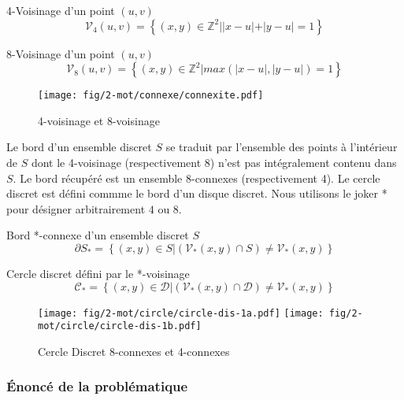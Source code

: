 \begin{Definition}{4-Voisinage d'un point $(u,v)$}
\label{def:vois-4}
  $$\mathcal{V}_4(u,v) =  \left\{ (x,y) \in \mathbb{Z}^{2} |  |x-u|+|y-u| = 1 \right\}$$
\end{Definition}

\begin{Definition}{8-Voisinage d'un point $(u,v)$}
\label{def:vois-8}
  $$\mathcal{V}_8(u,v) =  \left\{ (x,y) \in \mathbb{Z}^{2} |  max(|x-u|,|y-u|) = 1 \right\}$$
\end{Definition}

\begin{figure}[H]
  \centering
  \texttt{[image: fig/2-mot/connexe/connexite.pdf]}
  \caption{4-voisinage et 8-voisinage}
\end{figure}

Le bord d'un ensemble discret $S$ se traduit par l'ensemble des points à l'intérieur de $S$ dont le 4-voisinage (respectivement 8) n'est pas intégralement contenu dans $S$. Le bord récupéré est un ensemble 8-connexes (respectivement 4). Le cercle discret est défini commme le bord d'un disque discret. Nous utilisons le joker * pour désigner arbitrairement $4$ ou $8$. 

\begin{Definition}{Bord *-connexe d'un ensemble discret $S$}
\label{def:bord-ens}
  $$ \partial S_{*} =  \left\{ (x,y) \in S | \left( \mathcal{V}_{*}(x,y) \cap S \right) \neq \mathcal{V}_{*}(x,y) \right\}$$
\end{Definition}

\begin{Definition}{Cercle discret défini par le *-voisinage}
\label{def:cer-dis}
  $$ \mathcal{C}_{*} =  \left\{ (x,y) \in \mathcal{D} | \left( \mathcal{V}_{*}(x,y) \cap \mathcal{D} \right) \neq \mathcal{V}_{*}(x,y) \right\}$$
\end{Definition}

\begin{figure}[H]
  \centering
  \texttt{[image: fig/2-mot/circle/circle-dis-1a.pdf]}
  \texttt{[image: fig/2-mot/circle/circle-dis-1b.pdf]}
  \caption{Cercle Discret 8-connexes et 4-connexes}
\end{figure}


\subsubsection{Énoncé de la problématique}

